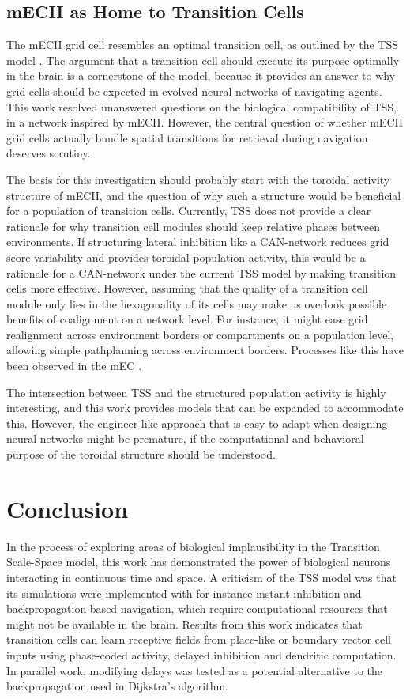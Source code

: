 \documentclass{article}
\begin{document}
    \subsection{mECII as Home to Transition Cells} \label{TSS model comparison}

    The mECII grid cell resembles an optimal transition cell, as outlined by the TSS model \parencite{Waniek2020}. The argument that a transition cell should execute its purpose optimally in the brain is a cornerstone of the model, because it provides an answer to why grid cells should be expected in evolved neural networks of navigating agents. This work resolved unanswered questions on the biological compatibility of TSS, in a network inspired by mECII. However, the central question of whether mECII grid cells actually bundle spatial transitions for retrieval during navigation deserves scrutiny.

    The basis for this investigation should probably start with the toroidal activity structure of mECII, and the question of why such a structure would be beneficial for a population of transition cells. Currently, TSS does not provide a clear rationale for why transition cell modules should keep relative phases between environments. If structuring lateral inhibition like a CAN-network reduces grid score variability and provides toroidal population activity, this would be a rationale for a CAN-network under the current TSS model by making transition cells more effective. However, assuming that the quality of a transition cell module only lies in the hexagonality of its cells may make us overlook possible benefits of coalignment on a network level. For instance, it might ease grid realignment across environment borders or compartments on a population level, allowing simple pathplanning across environment borders. Processes like this have been observed in the mEC \parencite{Carpenter2015}.

    The intersection between TSS and the structured population activity is highly interesting, and this work provides models that can be expanded to accommodate this. However, the engineer-like approach that is easy to adapt when designing neural networks might be premature, if the computational and behavioral purpose of the toroidal structure should be understood. 

    \newpage
    \section{Conclusion}
    In the process of exploring areas of biological implausibility in the Transition Scale-Space model, this work has demonstrated the power of biological neurons interacting in continuous time and space. A criticism of the TSS model was that its simulations were implemented with for instance instant inhibition and backpropagation-based navigation, which require computational resources that might not be available in the brain. Results from this work indicates that transition cells can learn receptive fields from place-like or boundary vector cell inputs using phase-coded activity, delayed inhibition and dendritic computation. In parallel work, modifying delays was tested as a potential alternative to the backpropagation used in Dijkstra's algorithm. 
    
\end{document}
